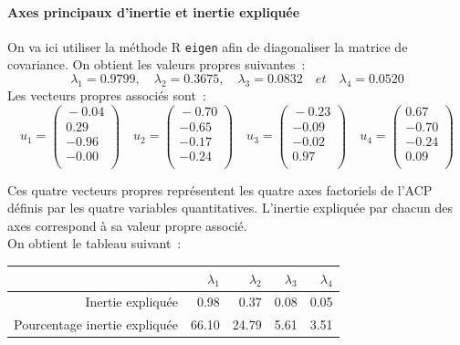 \documentclass[a4paper,11pt]{report}
\begin{document}
\paragraph{Axes principaux d'inertie et inertie expliquée} On va ici utiliser la méthode R \texttt{eigen} afin de diagonaliser la matrice de covariance.
On obtient les valeurs propres suivantes~:
\[
\lambda_1 = 0.9799,\quad
\lambda_2 = 0.3675,\quad
\lambda_3 = 0.0832 \quad et \quad 
\lambda_4 = 0.0520
\]
Les vecteurs propres associés sont~:
\[u_1 = 
\begin{pmatrix}{}
	-0.04 \\ 
	 0.29 \\ 
	-0.96 \\ 
	-0.00 \\ 
\end{pmatrix}\quad
u_2 = 
\begin{pmatrix}{}
	-0.70 \\ 
	-0.65 \\ 
	-0.17 \\ 
	-0.24 \\ 
\end{pmatrix}\quad
u_3 = 
\begin{pmatrix}{}
	-0.23 \\ 
	-0.09 \\ 
	-0.02 \\ 
 	 0.97 \\ 
\end{pmatrix}\quad
u_4 = 
\begin{pmatrix}{}
	 0.67 \\ 
	-0.70 \\ 
	-0.24 \\ 
	 0.09 \\ 
\end{pmatrix}
\]


Ces quatre vecteurs propres représentent les quatre axes factoriels de l'ACP définis par les quatre variables quantitatives. L'inertie expliquée par chacun des axes correspond à sa valeur propre associé.\\
On obtient le tableau suivant~:
\begin{table}[H]
	\centering
	\begin{tabular}{r|rrrr}
		& $\lambda_1$ & $\lambda_2$ & $\lambda_3$ & $\lambda_4$ \\ 
		\hline
		Inertie expliquée & 0.98 & 0.37 & 0.08 & 0.05 \\ 
		Pourcentage inertie expliquée & 66.10 & 24.79 & 5.61 & 3.51 \\ 
	\end{tabular}
\end{table}
\end{document}
